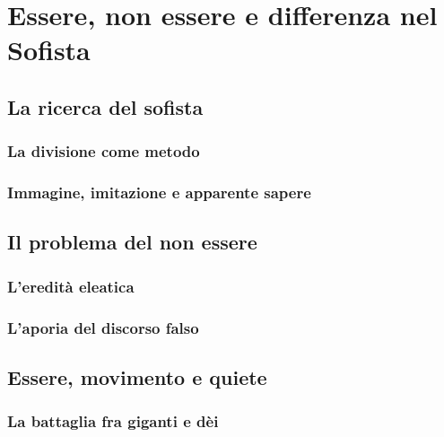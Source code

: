 \chapter{Essere, non essere e differenza nel Sofista}
\label{cap:platone:sofista}

\section{La ricerca del sofista}

\subsection{La divisione come metodo}

\subsection{Immagine, imitazione e apparente sapere}

\section{Il problema del non essere}

\subsection{L'eredità eleatica}

\subsection{L'aporia del discorso falso}

\section{Essere, movimento e quiete}

\subsection{La battaglia fra giganti e dèi}


